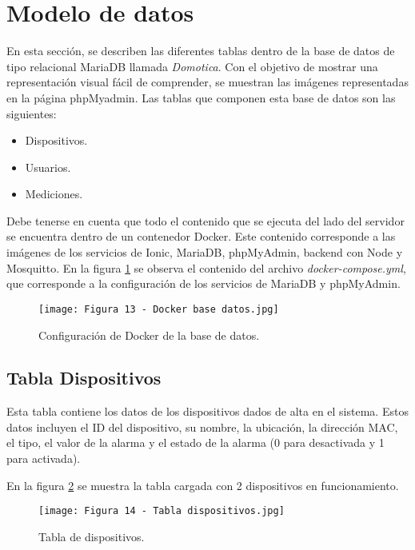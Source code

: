 \section{Modelo de datos}

En esta sección, se describen las diferentes tablas dentro de la base de datos de tipo relacional MariaDB llamada \textit{Domotica}. Con el objetivo de mostrar una representación visual fácil de comprender, se muestran las imágenes representadas en la página phpMyadmin. Las tablas que componen esta base de datos son las siguientes:

\begin{itemize}
	\item Dispositivos.
	\item Usuarios.
	\item Mediciones.
\end{itemize}

Debe tenerse en cuenta que todo el contenido que se ejecuta del lado del servidor se encuentra dentro de un contenedor Docker. Este contenido corresponde a las imágenes de los servicios de Ionic, MariaDB, phpMyAdmin, backend con Node y Mosquitto. En la figura \ref{fig:13} se observa el contenido del archivo \textit{docker-compose.yml}, que corresponde a la configuración de los servicios de MariaDB y phpMyAdmin.

\newpage
\begin{figure}[h]
\centering
\texttt{[image: Figura 13 - Docker base datos.jpg]}
\caption[Docker base datos]{Configuración de Docker de la base de datos.}
\label{fig:13}
\end{figure}

\subsection{Tabla Dispositivos}

Esta tabla contiene los datos de los dispositivos dados de alta en el sistema. Estos datos incluyen el ID del dispositivo, su nombre, la ubicación, la dirección MAC, el tipo, el valor de la alarma y el estado de la alarma (0 para desactivada y 1 para activada).

En la figura \ref{fig:14} se muestra la tabla cargada con 2 dispositivos en funcionamiento.

\begin{figure}[h]
\centering
\texttt{[image: Figura 14 - Tabla dispositivos.jpg]}
\caption[Tabla dispositivos]{Tabla de dispositivos.}
\label{fig:14}
\end{figure}

